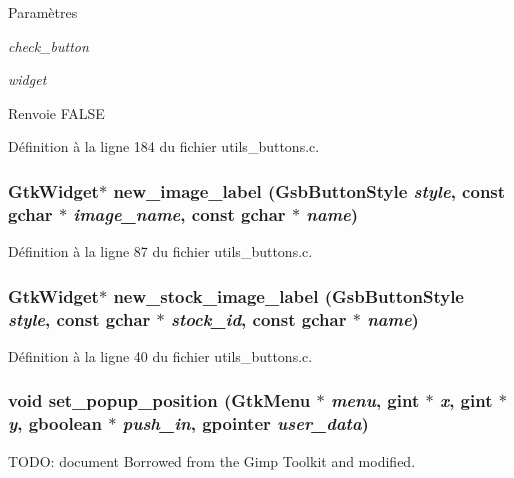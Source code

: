 \begin{DoxyParams}{Paramètres}
\item[{\em check\_\-button}]\item[{\em widget}]\end{DoxyParams}
\begin{DoxyReturn}{Renvoie}
FALSE 
\end{DoxyReturn}


Définition à la ligne 184 du fichier utils\_\-buttons.c.

\subsubsection[{new\_\-image\_\-label}]{\setlength{\rightskip}{0pt plus 5cm}GtkWidget$\ast$ new\_\-image\_\-label ({\bf GsbButtonStyle} {\em style}, \/  const gchar $\ast$ {\em image\_\-name}, \/  const gchar $\ast$ {\em name})}\label{utils__buttons_8c_ad3b9b13c8568d4b884cac0d402d54c3c}


Définition à la ligne 87 du fichier utils\_\-buttons.c.

\subsubsection[{new\_\-stock\_\-image\_\-label}]{\setlength{\rightskip}{0pt plus 5cm}GtkWidget$\ast$ new\_\-stock\_\-image\_\-label ({\bf GsbButtonStyle} {\em style}, \/  const gchar $\ast$ {\em stock\_\-id}, \/  const gchar $\ast$ {\em name})}\label{utils__buttons_8c_a239d96ea80c3728beec14f95995cabef}


Définition à la ligne 40 du fichier utils\_\-buttons.c.

\subsubsection[{set\_\-popup\_\-position}]{\setlength{\rightskip}{0pt plus 5cm}void set\_\-popup\_\-position (GtkMenu $\ast$ {\em menu}, \/  gint $\ast$ {\em x}, \/  gint $\ast$ {\em y}, \/  gboolean $\ast$ {\em push\_\-in}, \/  gpointer {\em user\_\-data})}\label{utils__buttons_8c_a99ce5771bb0e5986914ff73a90ced973}
TODO: document Borrowed from the Gimp Toolkit and modified. 

